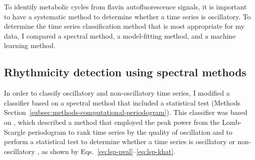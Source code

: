 To identify metabolic cycles from flavin autofluorescence signals, it is important to have a systematic method to determine whether a time series is oscillatory.
To determine the time series classification method that is most appropriate for my data, I compared a spectral method, a model-fitting method, and a machine learning method.


\subsection{Rhythmicity detection using spectral methods}
\label{subsec:analysis-classification-spectral}

In order to classify oscillatory and non-oscillatory time series, I modified a classifier based on a spectral method that included a statistical test (Methods Section~\ref{subsec:methods-computational-periodogram}).
This classifier was based on \textcite{glynnDetectingPeriodicPatterns2006a}, which described a method that employed the peak power from the Lomb-Scargle periodogram \parencite{lombLeastsquaresFrequencyAnalysis1976} to rank time series by the quality of oscillation and to perform a statistical test to determine whether a time series is oscillatory or non-oscillatory \parencite{scargleStudiesAstronomicalTime1982}, as shown by Eqs.\ \ref{eq:lsp-pval}--\ref{eq:lsp-khat}.

